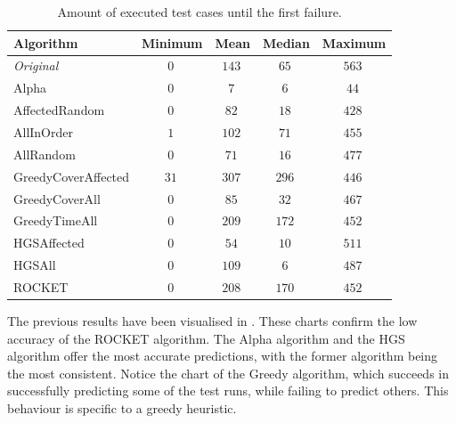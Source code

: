 \begin{table}[h]
	\centering
	\begin{tabularx}{\textwidth}{|X||c|c|c|c|}
		\hline
		\textbf{Algorithm} & \textbf{Minimum} & \textbf{Mean} & \textbf{Median} & \textbf{Maximum}\\
		
		\hline
		
		\emph{Original} & $\SI{0}{}$ & $\SI{143}{}$ & $\SI{65}{}$ & $\SI{563}{}$\\
		
		\hline
		
		Alpha & $\SI{0}{}$ & $\SI{7}{}$ & $\SI{6}{}$ & $\SI{44}{}$\\
		
		\hline
		AffectedRandom & $\SI{0}{}$ & $\SI{82}{}$ & $\SI{18}{}$ & $\SI{428}{}$\\
		AllInOrder & $\SI{1}{}$ & $\SI{102}{}$ & $\SI{71}{}$ & $\SI{455}{}$\\
		AllRandom & $\SI{0}{}$ & $\SI{71}{}$ & $\SI{16}{}$ & $\SI{477}{}$\\
		
		\hline
		
		GreedyCoverAffected & $\SI{31}{}$ & $\SI{307}{}$ & $\SI{296}{}$ & $\SI{446}{}$\\
		GreedyCoverAll & $\SI{0}{}$ & $\SI{85}{}$ & $\SI{32}{}$ & $\SI{467}{}$\\
		GreedyTimeAll & $\SI{0}{}$ & $\SI{209}{}$ & $\SI{172}{}$ & $\SI{452}{}$\\
		
		\hline
		
		HGSAffected & $\SI{0}{}$ & $\SI{54}{}$ & $\SI{10}{}$ & $\SI{511}{}$\\
		HGSAll & $\SI{0}{}$ & $\SI{109}{}$ & $\SI{6}{}$ & $\SI{487}{}$\\
		
		\hline
		
		ROCKET & $\SI{0}{}$ & $\SI{208}{}$ & $\SI{170}{}$ & $\SI{452}{}$\\
		
		\hline
	\end{tabularx}
	\caption{Amount of executed test cases until the first failure.}
	\label{tbl:rq4-first-failure}
\end{table}

\noindent The previous results have been visualised in . These charts confirm the low accuracy of the ROCKET algorithm. The Alpha algorithm and the HGS algorithm offer the most accurate predictions, with the former algorithm being the most consistent. Notice the chart of the Greedy algorithm, which succeeds in successfully predicting some of the test runs, while failing to predict others. This behaviour is specific to a greedy heuristic.\\

